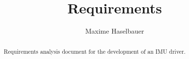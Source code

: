 \documentclass[a4paper,10pt]{article}
\title{Requirements}
\author{Maxime Haselbauer}
\begin{document}
\maketitle
\begin{abstract}
Requirements analysis document for the development of an IMU driver.
\end{abstract}
\printnomenclature
\printglossaries







\printbibliography
\end{document}
